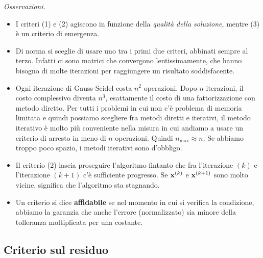 \textit{Osservazioni.}
\begin{itemize}
\item I criteri (1) e (2) agiscono in funzione della \textit{qualità della soluzione}, mentre (3) è un criterio di emergenza.
\item Di norma si sceglie di usare uno tra i primi due criteri, abbinati sempre al terzo. Infatti ci sono matrici che convergono lentissimamente, che hanno bisogno di molte iterazioni per raggiungere un risultato soddisfacente.
\item Ogni iterazione di Gauss-Seidel costa $n^{2}$ operazioni. Dopo $n$ iterazioni, il costo complessivo diventa $n^{3}$, esattamente il costo di una fattorizzazione con metodo diretto. Per tutti i problemi in cui non c'è problema di memoria limitata e quindi possiamo scegliere fra metodi diretti e iterativi, il metodo iterativo è molto più conveniente nella misura in cui andiamo a usare un criterio di arresto in meno di $n$ operazioni. Quindi $n_{\text{max}} \approx n$. Se abbiamo troppo poco spazio, i metodi iterativi sono d'obbligo.
\item Il criterio (2) lascia proseguire l'algoritmo fintanto che fra l'iterazione $(k)$ e l'iterazione $( k+1)$ c'è sufficiente progresso. Se $\mathbf{x}^{(k)}$ e $\mathbf{x}^{( k+1)}$ sono molto vicine, significa che l'algoritmo sta stagnando.
\item Un criterio si dice \textbf{affidabile} se nel momento in cui si verifica la condizione, abbiamo la garanzia che anche l'errore (normalizzato) sia minore della tolleranza moltiplicata per una costante.
\end{itemize}
\subsection{Criterio sul residuo}


